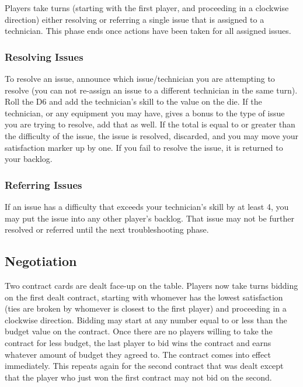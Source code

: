 \documentclass[twocolumn]{article}
\begin{document}
Players take turns (starting with the first player, and proceeding in a clockwise direction) either
resolving or referring a single issue that is assigned to a technician. This phase ends once actions have been taken for all assigned issues.

\subsubsection*{Resolving Issues}

To resolve an issue, announce which issue/technician you are attempting to resolve (you can not re-assign an issue to a different technician in the same turn). Roll the D6 and add the technician's skill to the value on the die. If the technician, or any equipment you may have, gives a bonus to the type of issue you are trying to resolve, add that as well. If the total is equal to or greater than the difficulty of the issue, the issue is resolved, discarded, and you may move your satisfaction marker up by one.
If you fail to resolve the issue, it is returned to your backlog.

\subsubsection*{Referring Issues}

If an issue has a difficulty that exceeds your technician's skill by at least 4, you may put the issue into any other player's backlog. That issue may not be further resolved or referred until the next troubleshooting phase.


\subsection*{Negotiation}

Two contract cards are dealt face-up on the table. Players now take turns bidding on the first dealt contract, starting with whomever has the lowest satisfaction (ties are broken by whomever is closest to the first player) and proceeding in a clockwise direction. Bidding may start at any number equal to or less than the budget value on the contract. Once there are no players willing to take the contract for less budget, the last player to bid wins the contract and earns whatever amount of budget they agreed to. The contract comes into effect immediately.
This repeats again for the second contract that was dealt except that the player who just won the first contract may not bid on the second.
\end{document}

